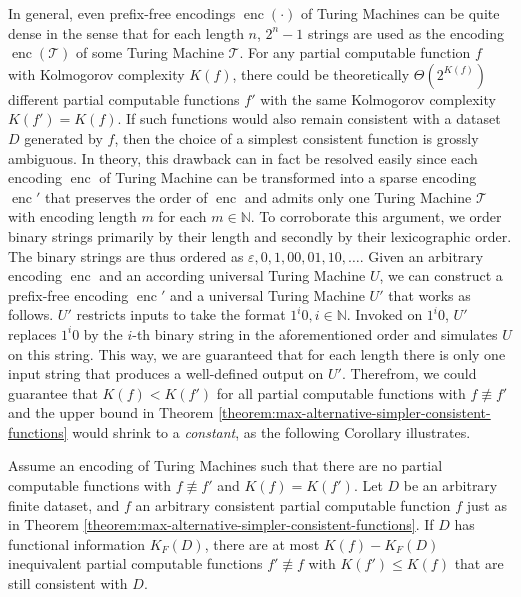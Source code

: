 In general, even prefix-free encodings $\operatorname{enc}(\cdot)$ of Turing Machines can be quite dense in the sense that for each length $n$, $2^n-1$ strings are used as the encoding $\operatorname{enc}(\mathcal{T})$ of some Turing Machine $\mathcal{T}$.
For any partial computable function $f$ with Kolmogorov complexity $K(f)$, there could be theoretically $\Theta(2^{K(f)})$ different partial computable functions $f'$ with the same Kolmogorov complexity $K(f')=K(f)$.
If such functions would also remain consistent with a dataset $D$ generated by $f$, then the choice of a simplest consistent function is grossly ambiguous.
In theory, this drawback can in fact be resolved easily since each encoding $\operatorname{enc}$ of Turing Machine can be transformed into a sparse encoding $\operatorname{enc}'$ that preserves the order of $\operatorname{enc}$ and admits only one Turing Machine $\mathcal{T}$ with encoding length $m$ for each $m\in\mathbb{N}$.
To corroborate this argument, we order binary strings primarily by their length and secondly by their lexicographic order.
The binary strings are thus ordered as $\varepsilon,0,1,00,01,10,\dots$. 
Given an arbitrary encoding $\operatorname{enc}$ and an according universal Turing Machine $U$, we can construct a prefix-free encoding $\operatorname{enc}'$ and a universal Turing Machine $U'$ that works as follows.
$U'$ restricts inputs to take the format $1^{i}0,i\in\mathbb{N}$.
Invoked on $1^{i}0$, $U'$ replaces $1^{i}0$ by the $i$-th binary string in the aforementioned order and simulates $U$ on this string.
This way, we are guaranteed that for each length there is only one input string that produces a well-defined output on $U'$. 
Therefrom, we could guarantee that $K(f)<K(f')$ for all partial computable functions with $f\not\equiv f'$ and the upper bound in Theorem \ref{theorem:max-alternative-simpler-consistent-functions} would shrink to a \textit{constant}, as the following Corollary illustrates.
\begin{corollary}
	\label{cor:constant-max-alternative-simpler-consistent-functions}
	Assume an encoding of Turing Machines such that there are no partial computable functions with $f\not\equiv f'$ and $K(f)=K(f')$.
	Let $D$ be an arbitrary finite dataset, and $f$ an arbitrary consistent partial computable function $f$ just as in Theorem \ref{theorem:max-alternative-simpler-consistent-functions}. 
	If $D$ has functional information $K_F(D)$, there are at most $K(f)-K_F(D)$ inequivalent partial computable functions $f'\not\equiv f$ with $K(f')\leq K(f)$ that are still consistent with $D$.
\end{corollary}
